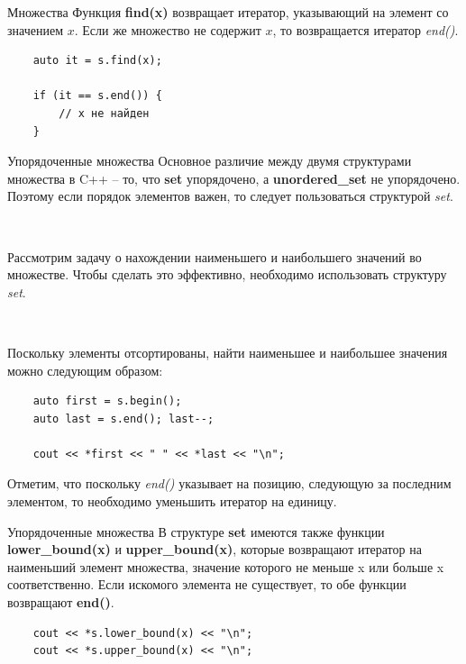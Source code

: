 \documentclass{beamer}
\begin{document}
\begin{frame}[fragile]{Множества}
    Функция \textbf{find(x)} возвращает итератор, указывающий на элемент со значением $x$. Если же множество не содержит $x$, то возвращается итератор \textit{end()}.

    \begin{verbatim}
    auto it = s.find(x);

    if (it == s.end()) {
	    // x не найден
    }
    \end{verbatim}
\end{frame}

\begin{frame}[fragile]{Упорядоченные множества}
    Основное различие между двумя структурами множества в C++ – то, что \textbf{set} упорядочено, а \textbf{unordered\_set} не упорядочено. Поэтому если порядок элементов важен, то следует пользоваться структурой \textit{set}.

    ~
    
    Рассмотрим задачу о нахождении наименьшего и наибольшего значений во множестве. Чтобы сделать это эффективно, необходимо использовать структуру \textit{set}.
    
    ~
    
    Поскольку элементы отсортированы, найти наименьшее и наибольшее значения можно следующим образом:
    \begin{verbatim}
    auto first = s.begin();
    auto last = s.end(); last--;
    
    cout << *first << " " << *last << "\n";
    \end{verbatim}
    
    Отметим, что поскольку \textit{end()} указывает на позицию, следующую за последним элементом, то необходимо уменьшить итератор на единицу.
\end{frame}

\begin{frame}[fragile]{Упорядоченные множества}
    В структуре \textbf{set} имеются также функции \textbf{lower\_bound(x)} и \textbf{upper\_bound(x)}, которые возвращают итератор на наименьший элемент множества, значение которого не меньше x или больше x соответственно. Если искомого элемента не существует, то обе функции возвращают \textbf{end()}.
    
    \begin{verbatim}
    cout << *s.lower_bound(x) << "\n";
    cout << *s.upper_bound(x) << "\n";
    \end{verbatim}
\end{frame}
\end{document}
